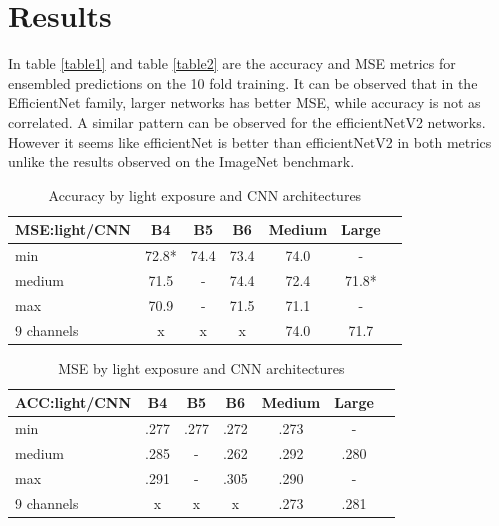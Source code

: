 \documentclass[10pt,letterpaper]{article}
\begin{document}
\section*{Results}

In table \ref{table1} and table \ref{table2} are the accuracy and MSE metrics
for ensembled predictions on the 10 fold training. It can be observed that in the EfficientNet family,
larger networks has better MSE, while accuracy is not as correlated.
A similar pattern can be observed for the efficientNetV2 networks.
However it seems like efficientNet is better than efficientNetV2 in both metrics unlike
the results observed on the ImageNet benchmark.

\begin{center}
\begin{table}[hbt!]
\caption{Accuracy by light exposure and CNN architectures}
\begin{tabular}{ |l|c|c|c|c|c|c| }
\hline
MSE:light/CNN & B4 & B5 & B6 & Medium & Large \\ \hline
min        & 72.8* & 74.4 & 73.4 & 74.0 & -  \\ 
medium     & 71.5 & - & 74.4 & 72.4 & 71.8*  \\ 
max        & 70.9 & - & 71.5 & 71.1 & -  \\ 
9 channels & x & x & x & 74.0 & 71.7  \\ 
\hline
\end{tabular}
\label{table6}
\end{table}
\end{center}

\begin{center}
\begin{table}[hbt!]
\caption{MSE by light exposure and CNN architectures}
\begin{tabular}{ |l|c|c|c|c|c|c| }

\hline
ACC:light/CNN & B4 & B5 & B6 & Medium & Large  \\ \hline
min        & .277 & .277 & .272 & .273 & -  \\ 
medium     & .285 & - & .262 & .292 & .280  \\ 
max        & .291 & - & .305 & .290 & -  \\ 
9 channels & x & x & x & .273 & .281  \\ 
\hline
\end{tabular}
\label{table7}
\end{table}
\end{center}
\end{document}
